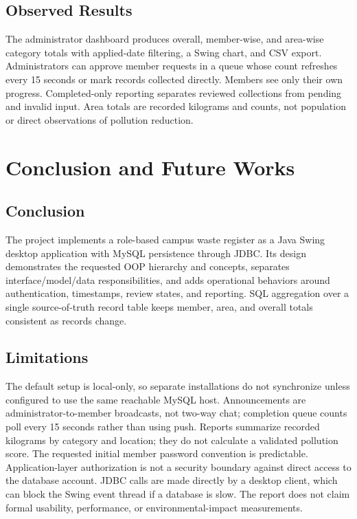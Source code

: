 \documentclass[12pt,a4paper]{report}
\begin{document}
\section{Observed Results}
The administrator dashboard produces overall, member-wise, and area-wise category totals with applied-date filtering, a Swing chart, and CSV export. Administrators can approve member requests in a queue whose count refreshes every 15 seconds or mark records collected directly. Members see only their own progress. Completed-only reporting separates reviewed collections from pending and invalid input. Area totals are recorded kilograms and counts, not population or direct observations of pollution reduction.

\chapter{Conclusion and Future Works}
\section{Conclusion}
The project implements a role-based campus waste register as a Java Swing desktop application with MySQL persistence through JDBC. Its design demonstrates the requested OOP hierarchy and concepts, separates interface/model/data responsibilities, and adds operational behaviors around authentication, timestamps, review states, and reporting. SQL aggregation over a single source-of-truth record table keeps member, area, and overall totals consistent as records change.

\section{Limitations}
The default setup is local-only, so separate installations do not synchronize unless configured to use the same reachable MySQL host. Announcements are administrator-to-member broadcasts, not two-way chat; completion queue counts poll every 15 seconds rather than using push. Reports summarize recorded kilograms by category and location; they do not calculate a validated pollution score. The requested initial member password convention is predictable. Application-layer authorization is not a security boundary against direct access to the database account. JDBC calls are made directly by a desktop client, which can block the Swing event thread if a database is slow. The report does not claim formal usability, performance, or environmental-impact measurements.
\end{document}
